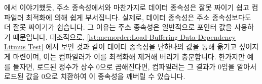 \fi

에서 이야기했듯, 주소 종속성에서와 마찬가지로 데이터 종속성은 잘못 짜이기 쉽고
컴파일러 최적화에 의해 쉽게 부서집니다.
실제로, 데이터 종속성은 주소 종속성보다도 더 잘못 짜이기가 쉽습니다.
그 이유는 주소 종속성은 일반적으로 포인터 값을 사용하기 때문입니다.
대조적으로,
\cref{lst:memorder:Load-Buffering Data-Dependency Litmus Test} 에서 보인 것과
같이 데이터 종속성을 단하나의 값을 통해 옮기고 싶어지게 마련이며, 이는
컴파일러가 이를 최적화해 제거해 버리기 충분합니다.
한가지만 예를 들자면, 로드된 정수가 상수 0으로 곱해진다면, 컴파일러는 그 결과가
0임을 알아서 로드된 값을 0으로 치환하여 이 종속성을 깨버릴 수 있습니다.

